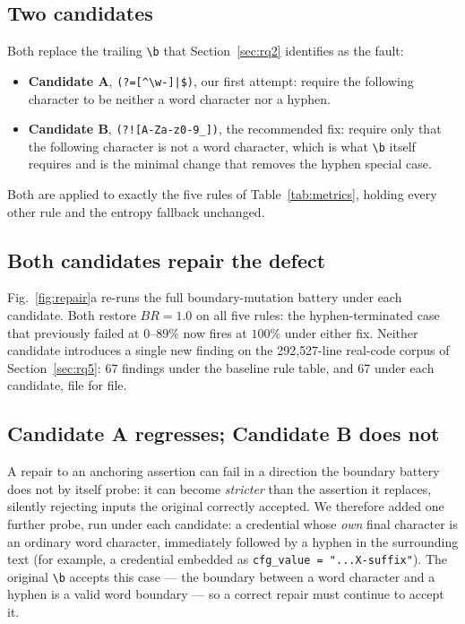 \documentclass[pdflatex,sn-basic]{sn-jnl}
\begin{document}
\subsection{Two candidates}

Both replace the trailing \verb|\b| that Section~\ref{sec:rq2} identifies as the fault:
\begin{itemize}
\item \textbf{Candidate A}, \verb+(?=[^\w-]|$)+, our first attempt: require the following character to be neither a word character nor a hyphen.
\item \textbf{Candidate B}, \verb+(?![A-Za-z0-9_])+, the recommended fix: require only that the following character is not a word character, which is what \verb|\b| itself requires and is the minimal change that removes the hyphen special case.
\end{itemize}
Both are applied to exactly the five rules of Table~\ref{tab:metrics}, holding every other rule and the entropy fallback unchanged.

\subsection{Both candidates repair the defect}

Fig.~\ref{fig:repair}a re-runs the full boundary-mutation battery under each candidate. Both restore $BR = 1.0$ on all five rules: the hyphen-terminated case that previously failed at $0$--$89\%$ now fires at $100\%$ under either fix. Neither candidate introduces a single new finding on the 292{,}527-line real-code corpus of Section~\ref{sec:rq5}: 67 findings under the baseline rule table, and 67 under each candidate, file for file.

\subsection{Candidate A regresses; Candidate B does not}
\label{sec:regression}

A repair to an anchoring assertion can fail in a direction the boundary battery does not by itself probe: it can become \emph{stricter} than the assertion it replaces, silently rejecting inputs the original correctly accepted. We therefore added one further probe, run under each candidate: a credential whose \emph{own} final character is an ordinary word character, immediately followed by a hyphen in the surrounding text (for example, a credential embedded as \verb|cfg_value = "...X-suffix"|). The original \verb|\b| accepts this case --- the boundary between a word character and a hyphen is a valid word boundary --- so a correct repair must continue to accept it.
\end{document}
